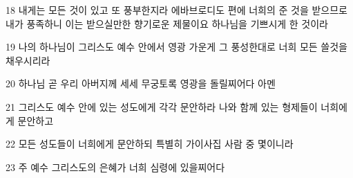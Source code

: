 \par 18 내게는 모든 것이 있고 또 풍부한지라 에바브로디도 편에 너희의 준 것을 받으므로 내가 풍족하니 이는 받으실만한 향기로운 제물이요 하나님을 기쁘시게 한 것이라
\par 19 나의 하나님이 그리스도 예수 안에서 영광 가운게 그 풍성한대로 너희 모든 쓸것을 채우시리라
\par 20 하나님 곧 우리 아버지께 세세 무궁토록 영광을 돌릴찌어다 아멘
\par 21 그리스도 예수 안에 있는 성도에게 각각 문안하라 나와 함께 있는 형제들이 너희에게 문안하고
\par 22 모든 성도들이 너희에게 문안하되 특별히 가이사집 사람 중 몇이니라
\par 23 주 예수 그리스도의 은혜가 너희 심령에 있을찌어다


